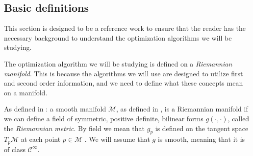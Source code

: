 \subsection{Basic definitions}
This section is designed to be a reference work to ensure that the reader has the necessary background to understand the optimization algorithms we will be studying. 

The optimization algorithm we will be studying is defined on a \textit{Riemannian manifold}. This is because the algorithms we will use are designed to utilize first and second order information, and we need to define what these concepts mean on a manifold. 





\begin{definition}\label{def:tangent_space}
    
\end{definition}

\begin{definition}\label{def:riemannian_manifold}
    As defined in \cite[def~2.6,~p.~179]{Boothby1975}: a \textup{smooth manifold} $\mathcal{M}$, as defined in \cite[p.~13]{Lee2012:1},  is a \textup{Riemannian manifold} if we can define a field of symmetric, positive definite, bilinear forms $g(\cdot,\cdot)$, called the \textit{Riemannian metric}. By field we mean that $g_p$ is defined on the tangent space $T_p\mathcal{M}$ at each point $p\in \mathcal{M}$ \cite[def~2.1,~p.~178]{Boothby1975}. We will assume that $g$ is smooth, meaning that it is of class $\mathcal{C}^\infty$.
\end{definition}

